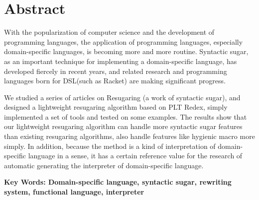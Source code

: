 \documentclass[UTF8,openany,AutoFakeBold,AutoFakeSlant,cs4size]{ctexbook}
\begin{document}
\fancyhf{}
\fancyfoot[CO,CE]{~\thepage~}
\renewcommand{\headrulewidth}{0.7pt}
\renewcommand{\footrulewidth}{0pt}
\clearpage






\small
\linespread{1.5}\selectfont
\chapter*{\bfseries Abstract}
With the popularization of computer science and the development of programming languages, the application of programming languages, especially domain-specific languages, is becoming more and more routine. Syntactic sugar, as an important technique for implementing a domain-specific language, has developed fiercely in recent years, and related research and programming languages born for DSL(such as Racket) are making significant progress.

We studied a series of articles on Resugaring (a work of syntactic sugar), and designed a lightweight resugaring algorithm based on PLT Redex, simply implemented a set of tools and tested on some examples. The results show that our lightweight resugaring algorithm can handle more syntactic sugar features than existing resugaring algorithms, also handle features like hygienic macro more simply. In addition, because the method is a kind of interpretation of domain-specific language in a sense, it has a certain reference value for the research of  automatic generating the interpreter of domain-specific language.
\bigskip
\noindent

{\bfseries Key Words: Domain-specific language, syntactic sugar, rewriting system, functional language, interpreter }



{
	\fancyhf{}
	\fancyfoot[CO,CE]{~\thepage~}
	\renewcommand{\headrulewidth}{0.7pt}
	\renewcommand{\footrulewidth}{0pt}
}
\fancyhf{}
\fancyfoot[CO,CE]{~\thepage~}
\renewcommand{\headrulewidth}{0.7pt}
\renewcommand{\footrulewidth}{0pt}
\clearpage





{
	\fancyhf{}
	\fancyfoot[CO,CE]{~\thepage~}
	\renewcommand{\headrulewidth}{0.7pt}
	\renewcommand{\footrulewidth}{0pt}
}
\fancyhf{}
\fancyfoot[CO,CE]{~\thepage~}
\renewcommand{\headrulewidth}{0.7pt}
\renewcommand{\footrulewidth}{0pt}
\renewcommand{\contentsname}{\centerline{全文目录}}
\tableofcontents
{}
\clearpage
\end{document}
